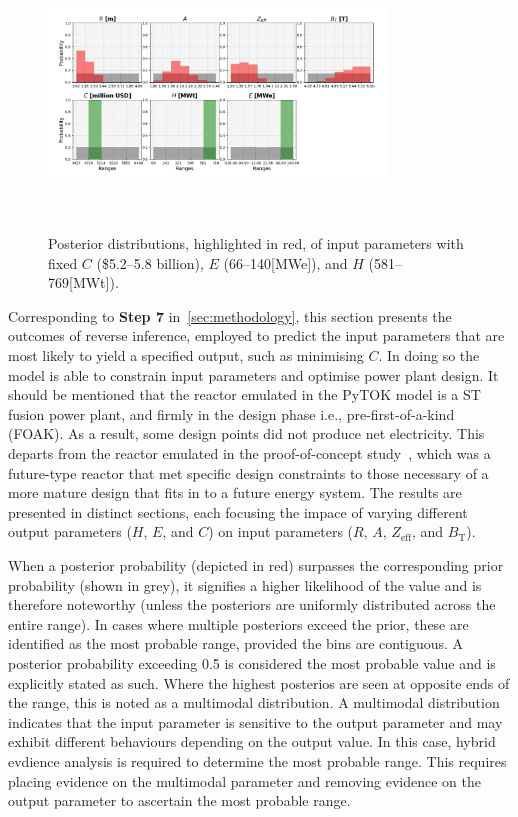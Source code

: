 \documentclass[journal]{IEEEtran}
\begin{document}
\begin{figure}[t]
    \centering
    \includegraphics[width=0.80\textwidth]{figures/TE_results/march_data/config(57)_3outputs_v2_6.png}
    \caption{\small Posterior distributions, highlighted in red, of input parameters with fixed $C$ (\$5.2--5.8 billion), $E$ (66--140[MWe]), and $H$ (581--769[MWt]).}~\label{config(57)_outputs(4)3_eg}
\end{figure}

Corresponding to \textbf{Step 7} in~\ref{sec:methodology}, this section presents the outcomes of reverse inference, employed to predict the input parameters that are most likely to yield a specified output, such as minimising $C$. In doing so the model is able to constrain input parameters and optimise power plant design. It should be mentioned that the reactor emulated in the PyTOK model is a ST fusion power plant, and firmly in the design phase i.e., pre-first-of-a-kind (FOAK). As a result, some design points did not produce net electricity. This departs from the reactor emulated in the proof-of-concept study~\cite{Griffiths2024}, which was a future-type reactor that met specific design constraints to those necessary of a more mature design that fits in to a future energy system. The results are presented in distinct sections, each focusing the impace of varying different output parameters ($H$, $E$, and $C$) on input parameters ($R$, $A$, $Z_{\text{eff}}$, and $B_{\text{T}}$).

When a posterior probability (depicted in red) surpasses the corresponding prior probability (shown in grey), it signifies a higher likelihood of the value and is therefore noteworthy (unless the posteriors are uniformly distributed across the entire range). In cases where multiple posteriors exceed the prior, these are identified as the most probable range, provided the bins are contiguous. A posterior probability exceeding 0.5 is considered the most probable value and is explicitly stated as such. Where the highest posterios are seen at opposite ends of the range, this is noted as a multimodal distribution. A multimodal distribution indicates that the input parameter is sensitive to the output parameter and may exhibit different behaviours depending on the output value. In this case, hybrid evdience analysis is required to determine the most probable range. This requires placing evidence on the multimodal parameter and removing evidence on the output parameter to ascertain the most probable range.   
\end{document}
